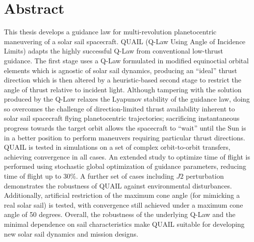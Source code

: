 \vspace*{\fill}
\section*{Abstract}
This thesis develops a guidance law for multi-revolution planetocentric maneuvering of a solar sail spacecraft. QUAIL (Q-Law Using Angle of Incidence Limits) adapts the highly successful Q-Law from conventional low-thrust guidance. The first stage uses a Q-Law formulated in modified equinoctial orbital elements which is agnostic of solar sail dynamics, producing an ``ideal'' thrust direction which is then altered by a heuristic-based second stage to restrict the angle of thrust relative to incident light. Although tampering with the solution produced by the Q-Law relaxes the Lyapunov stability of the guidance law, doing so overcomes the challenge of direction-limited thrust availability inherent to solar sail spacecraft flying planetocentric trajectories; sacrificing instantaneous progress towards the target orbit allows the spacecraft to ``wait'' until the Sun is in a better position to perform maneuvers requiring particular thrust directions. QUAIL is tested in simulations on a set of complex orbit-to-orbit transfers, achieving convergence in all cases. An extended study to optimize time of flight is performed using stochastic global optimization of guidance parameters, reducing time of flight up to 30\%. A further set of cases including \(J2\) perturbation demonstrates the robustness of QUAIL against environmental disturbances. Additionally, artificial restriction of the maximum cone angle (for mimicking a real solar sail) is tested, with convergence still achieved under a maximum cone angle of 50 degrees. Overall, the robustness of the underlying Q-Law and the minimal dependence on sail characteristics make QUAIL suitable for developing new solar sail dynamics and mission designs.
\vspace*{\fill}

\newpage
\vspace*{\fill}

